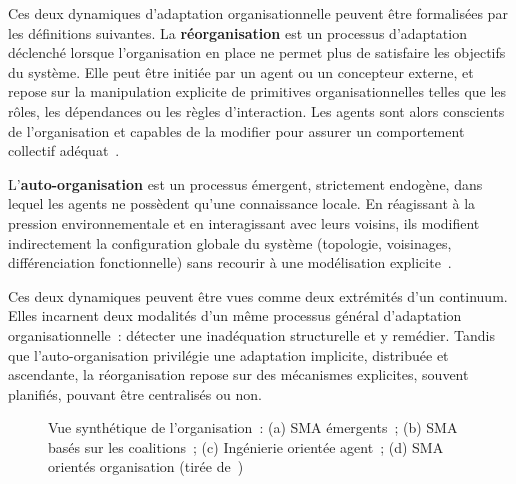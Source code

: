 Ces deux dynamiques d'adaptation organisationnelle peuvent être formalisées par les définitions suivantes. La \textbf{réorganisation} est un processus d'adaptation déclenché lorsque l'organisation en place ne permet plus de satisfaire les objectifs du système. Elle peut être initiée par un agent ou un concepteur externe, et repose sur la manipulation explicite de primitives organisationnelles telles que les rôles, les dépendances ou les règles d'interaction. Les agents sont alors conscients de l'organisation et capables de la modifier pour assurer un comportement collectif adéquat~\cite{Picard2009reorganisation}.

L'\textbf{auto-organisation} est un processus émergent, strictement endogène, dans lequel les agents ne possèdent qu'une connaissance locale. En réagissant à la pression environnementale et en interagissant avec leurs voisins, ils modifient indirectement la configuration globale du système (topologie, voisinages, différenciation fonctionnelle) sans recourir à une modélisation explicite~\cite{Picard2009reorganisation}.

Ces deux dynamiques peuvent être vues comme deux extrémités d'un continuum. Elles incarnent deux modalités d'un même processus général d'adaptation organisationnelle~: détecter une inadéquation structurelle et y remédier. Tandis que l'auto-organisation privilégie une adaptation implicite, distribuée et ascendante, la réorganisation repose sur des mécanismes explicites, souvent planifiés, pouvant être centralisés ou non.

\begin{figure}[h]
  \centering
  \resizebox{\textwidth}{!}{%
    
  }
  \caption[Vue synthétique de l'organisation (tirée de~\cite{Picard2009reorganisation})]{Vue synthétique de l'organisation~: (a) SMA émergents~; (b) SMA basés sur les coalitions~; (c) Ingénierie orientée agent~; (d) SMA orientés organisation (tirée de~\cite{Picard2009reorganisation})}
  \label{fig:auto_vs_topdown}
\end{figure}



